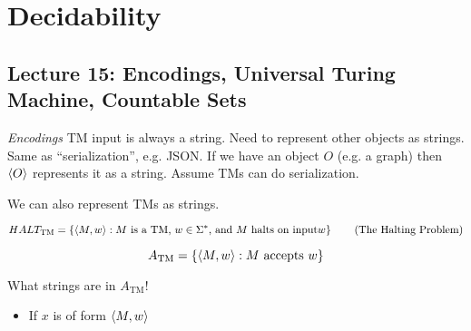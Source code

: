 \chapter{Decidability}

\section*{Lecture 15: Encodings, Universal Turing Machine, Countable Sets}

\emph{Encodings} \textsf{TM} input is always a string. Need to represent other objects as strings. Same as ``serialization'', e.g. JSON. If we have an object $O$ (e.g. a graph) then $\left \langle O \right \rangle$ represents it as a string. Assume TMs can do serialization.

We can also represent TMs as strings.

\begin{equation*}
    HALT_{\text{TM}} = \left \{ \left \langle M, w \right \rangle: M \text{ is a TM, } w \in \Sigma^* \text{, and } M \text{ halts on input} w \right \} \tag{The Halting Problem}
\end{equation*}

\begin{equation*}
    A_{\text{TM}} = \left \{ \left \langle M, w \right \rangle: M \text{ accepts } w \right \}
\end{equation*}

What strings are in $A_{\text{TM}}$!

\begin{itemize}
    \item If $x$ is of form $\left \langle M, w \right \rangle$
\end{itemize}

